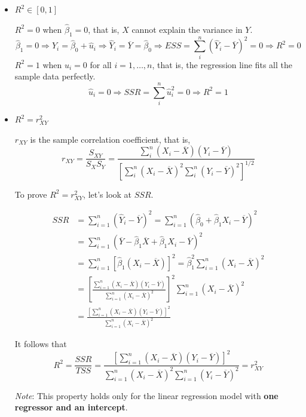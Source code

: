 \documentclass[a4paper,11pt]{article}
\begin{document}
\begin{itemize}
\item \(R^2 \in [0, 1]\)
\label{sec:org7c94514}

\(R^2 = 0\) when \(\hat{\beta}_1 = 0\), that is, \(X\) cannot explain the
variance in \(Y\).
\begin{equation*}
\hat{\beta}_1 = 0 \Rightarrow Y_i = \hat{\beta}_0 + \hat{u}_i
\Rightarrow \hat{Y}_i = \overline{Y} = \hat{\beta}_0 \Rightarrow ESS
= \sum_i^n (\hat{Y}_i - \overline{Y})^2 = 0 \Rightarrow R^2 = 0
\end{equation*}
\(R^2 = 1\) when \(\hat{u}_i = 0\) for all \(i = 1, \ldots, n\), that is,
the regression line fits all the sample data perfectly.
\[ \hat{u}_i = 0 \Rightarrow SSR = \sum_i^n \hat{u}_i^2 = 0
  \Rightarrow R^2 = 1 \]

\item \(R^2 = r^2_{XY}\)
\label{sec:org5cbb1e3}

\(r_{XY}\) is the sample correlation coefficient, that is,
\[ r_{XY} = \frac{S_{XY}}{S_X S_Y} = \frac{\sum_i^n(X_i -
  \overline{X})(Y_i - \overline{Y})}{\left[\sum_i^n (X_i - \overline{X})^2 \sum_i^n (Y_i -
  \overline{Y})^2 \right]^{1/2}} \]

To prove \(R^2 = r^2_{XY}\), let's look at \(SSR\).

\begin{align*}
SSR &= \sum_{i=1}^n (\hat{Y}_i - \overline{Y})^2 = \sum_{i=1}^n (\hat{\beta}_0 + \hat{\beta}_1 X_i - \overline{Y})^2 \\
&= \sum_{i=1}^n (\overline{Y} - \hat{\beta}_1 \overline{X} + \hat{\beta}_1 X_i - \overline{Y})^2 \\
&= \sum_{i=1}^n \left[ \hat{\beta}_1 (X_i - \overline{X}) \right]^2 = \hat{\beta}_1^2 \sum_{i=1}^n (X_i - \overline{X})^2 \\
&= \left[\frac{\sum_{i=1}^n (X_i - \overline{X})(Y_i - \overline{Y})}{\sum_{i=1}^n (X_i - \overline{X})^2}\right]^2 \sum_{i=1}^n (X_i - \overline{X})^2 \\
&= \frac{\left[ \sum_{i=1}^n (X_i - \overline{X})(Y_i - \overline{Y}) \right]^2}{\sum_{i=1}^n (X_i - \overline{X})^2}
\end{align*}

It follows that
\[
  R^2 = \frac{SSR}{TSS} = \frac{\left[ \sum_{i=1}^n (X_i - \overline{X})(Y_i - \overline{Y}) \right]^2}{\sum_{i=1}^n (X_i - \overline{X})^2 \sum_{i=1}^n (Y_i - \overline{Y})^2} = r^2_{XY}
  \]

\emph{Note}: This property holds only for the linear regression model
with \textbf{one regressor and an intercept}.
\end{itemize}
\end{document}
